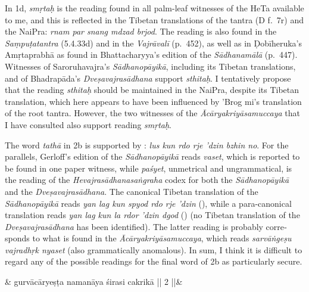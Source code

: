 \documentclass[naipra.tex]{subfiles}
\begin{document}
\begin{sanskrit}
{\begin{english}
		In 1d, \emph{smṛtaḥ} is the reading found in all palm-leaf witnesses of the HeTa available to me, and this is reflected in the Tibetan translations of the tantra (D f.\ 7r) and the NaiPra: \emph{rnam par snang mdzad brjod}.
		The reading is also found in the \emph{Saṃpuṭatantra} (5.4.33d) and in the \emph{Vajrāvalī} (p.\ 452), as well as in Ḍobīheruka's {Amṛtaprabhā} as found in Bhattacharyya's edition of the \emph{Sādhanamālā} (p.\ 447).
		Witnesses of Saroruhavajra's \emph{Sādhanopāyikā}, including its Tibetan translations, and of Bhadrapāda's \emph{Dveṣavajrasādhana} support \emph{sthitaḥ}.
		I tentatively propose that the reading \emph{sthitaḥ} should be maintained in the NaiPra, despite its Tibetan translation, which here appears to have been influenced by 'Brog mi's translation of the root tantra.
		However, the two witnesses of the \emph{Ācāryakriyāsamuccaya} that I have consulted also support reading \emph{smṛtaḥ}.

		The word \emph{tathā} in 2b is supported by \TIB : \emph{lus kun rdo rje 'dzin bzhin no}.
		For the parallels, Gerloff's edition of the \emph{Sādhanopāyikā} reads \emph{vaset}, which is reported to be found in one paper witness, while \emph{paśyet}, unmetrical and ungrammatical, is the reading of the \emph{Hevajrasādhanasaṅgraha} codex for both the \emph{Sādhanopāyikā} and the \emph{Dveṣavajrasādhana}.
		The canonical Tibetan translation of the \emph{Sādhanopāyikā} reads \emph{yan lag kun spyod rdo rje 'dzin} (\cite[vol.\ 1 135]{gerloff2020}), while a para-canonical translation reads \emph{yan lag kun la rdor 'dzin dgod} (\cite[vol.\ 2 152]{gerloff2020}) (no Tibetan translation of the \emph{Dveṣavajrasādhana} has been identified).
		The latter reading is probably corresponds to what is found in the \emph{Ācāryakriyāsamuccaya}, which reads \emph{sarvāṅgeṣu vajradhṛk nyaset} (also grammatically anomalous).
		In sum, I think it is difficult to regard any of the possible readings for the final word of 2b as particularly secure.
		\label{2bnote}
	\end{english}
} & 
gurvācāryeṣṭa namanāya śirasi cakrikā || 2 ||\&



\end{sanskrit}
\end{document}
